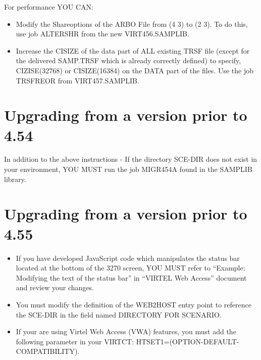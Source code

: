 \documentclass[letterpaper,10pt,english]{sphinxmanual}
\begin{document}
For performance YOU CAN:
\begin{itemize}
\item {} 
Modify the Shareoptions of the ARBO File from (4 3) to (2 3). To do this, use job ALTERSHR from the new VIRT456.SAMPLIB.

\item {} 
Increase the CISIZE of the data part of ALL existing TRSF file (except for the delivered SAMP.TRSF which is already correctly defined) to specify, CIZISE(32768) or CISIZE(16384) on the DATA part of the files. Use the job TRSFREOR from VIRT457.SAMPLIB.

\end{itemize}


\section{Upgrading from a version prior to 4.54}
\label{\detokenize{Migration_Guide:index-4}}\label{\detokenize{Migration_Guide:upgrading-from-a-version-prior-to-4-54}}
In addition to the above instructions
- If the directory SCE-DIR does not exist in your environment, YOU MUST run the job MIGR454A found in the SAMPLIB library.


\section{Upgrading from a version prior to 4.55}
\label{\detokenize{Migration_Guide:index-5}}\label{\detokenize{Migration_Guide:upgrading-from-a-version-prior-to-4-55}}\begin{itemize}
\item {} 
If you have developed JavaScript code which manipulates the status bar located at the bottom of the 3270 screen, YOU MUST refer to “Example: Modifying the text of the status bar” in “VIRTEL Web Access” document and review your changes.

\item {} 
You must modify the definition of the WEB2HOST entry point to reference the SCE-DIR in the field named DIRECTORY FOR SCENARIO.

\item {} 
If your are using Virtel Web Access (VWA) features, you must add the following parameter in your VIRTCT: HTSET1=(OPTION-DEFAULT-COMPATIBILITY).

\end{itemize}
\end{document}
